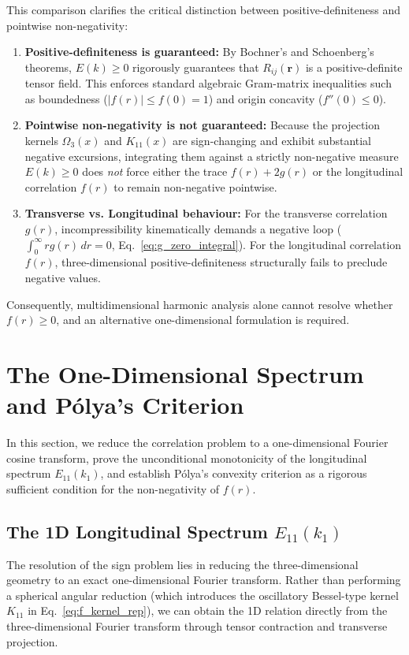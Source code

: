 \documentclass[lineno]{jfm}
\begin{document}
This comparison clarifies the critical distinction between positive-definiteness and pointwise non-negativity:
\begin{enumerate}
\item \textbf{Positive-definiteness is guaranteed:} By Bochner's and Schoenberg's theorems, $E(k) \ge 0$ rigorously guarantees that $R_{ij}(\mathbf{r})$ is a positive-definite tensor field. This enforces standard algebraic Gram-matrix inequalities such as boundedness ($|f(r)| \le f(0) = 1$) and origin concavity ($f''(0) \le 0$).
\item \textbf{Pointwise non-negativity is not guaranteed:} Because the projection kernels $\Omega_3(x)$ and $K_{11}(x)$ are sign-changing and exhibit substantial negative excursions, integrating them against a strictly non-negative measure $E(k) \ge 0$ does \emph{not} force either the trace $f(r) + 2g(r)$ or the longitudinal correlation $f(r)$ to remain non-negative pointwise.
\item \textbf{Transverse vs. Longitudinal behaviour:} For the transverse correlation $g(r)$, incompressibility kinematically demands a negative loop ($\int_0^\infty r g(r)\,dr = 0$, Eq.~\eqref{eq:g_zero_integral}). For the longitudinal correlation $f(r)$, three-dimensional positive-definiteness structurally fails to preclude negative values.
\end{enumerate}
Consequently, multidimensional harmonic analysis alone cannot resolve whether $f(r) \ge 0$, and an alternative one-dimensional formulation is required.

\section{The One-Dimensional Spectrum and P\'olya's Criterion}
\label{sec:polya_framework}

In this section, we reduce the correlation problem to a one-dimensional Fourier cosine transform, prove the unconditional monotonicity of the longitudinal spectrum $E_{11}(k_1)$, and establish P\'olya's convexity criterion as a rigorous sufficient condition for the non-negativity of $f(r)$.

\subsection{The 1D Longitudinal Spectrum \texorpdfstring{$E_{11}(k_1)$}{E11(k1)}}
\label{subsec:1d_spectrum}

The resolution of the sign problem lies in reducing the three-dimensional geometry to an exact one-dimensional Fourier transform. Rather than performing a spherical angular reduction (which introduces the oscillatory Bessel-type kernel $K_{11}$ in Eq.~\eqref{eq:f_kernel_rep}), we can obtain the 1D relation directly from the three-dimensional Fourier transform through tensor contraction and transverse projection.
\end{document}
